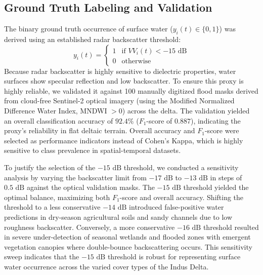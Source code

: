 \documentclass[12pt, a4paper]{article}
\begin{document}
\subsection{Ground Truth Labeling and Validation}
The binary ground truth occurrence of surface water ($y_i(t) \in \{0, 1\}$) was derived using an established radar backscatter threshold:
\begin{equation}
    y_i(t) = \begin{cases} 1 & \text{if } VV_i(t) < -15\text{ dB} \\ 0 & \text{otherwise} \end{cases}
\end{equation}
Because radar backscatter is highly sensitive to dielectric properties, water surfaces show specular reflection and low backscatter. To ensure this proxy is highly reliable, we validated it against 100 manually digitized flood masks derived from cloud-free Sentinel-2 optical imagery (using the Modified Normalized Difference Water Index, MNDWI $> 0$) across the delta. The validation yielded an overall classification accuracy of $92.4\%$ ($F_1$-score of $0.887$), indicating the proxy's reliability in flat deltaic terrain. Overall accuracy and $F_1$-score were selected as performance indicators instead of Cohen's Kappa, which is highly sensitive to class prevalence in spatial-temporal datasets.

To justify the selection of the $-15\text{ dB}$ threshold, we conducted a sensitivity analysis by varying the backscatter limit from $-17\text{ dB}$ to $-13\text{ dB}$ in steps of $0.5\text{ dB}$ against the optical validation masks. The $-15\text{ dB}$ threshold yielded the optimal balance, maximizing both $F_1$-score and overall accuracy. Shifting the threshold to a less conservative $-14\text{ dB}$ introduced false-positive water predictions in dry-season agricultural soils and sandy channels due to low roughness backscatter. Conversely, a more conservative $-16\text{ dB}$ threshold resulted in severe under-detection of seasonal wetlands and flooded zones with emergent vegetation canopies where double-bounce backscattering occurs. This sensitivity sweep indicates that the $-15\text{ dB}$ threshold is robust for representing surface water occurrence across the varied cover types of the Indus Delta.
\end{document}
